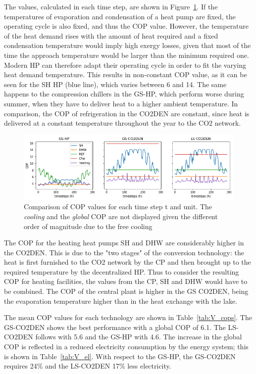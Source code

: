 \documentclass{article}
\begin{document}
The values, calculated in each time step, are shown in Figure~\ref{fig:v_cop}. If the temperatures of evaporation and condensation of a heat pump are fixed, the operating cycle is also fixed, and thus the COP value. However, the temperature of the heat demand rises with the amount of heat required and a fixed condensation temperature would imply high exergy losses, given that most of the time the approach temperature would be larger than the minimum required one. Modern HP can therefore adapt their operating cycle in order to fit the varying heat demand temperature. This results in non-constant COP value, as it can be seen for the SH HP (blue line), which varies between 6 and 14. The same happens to the compression chillers in the GS-HP, which perform worse during summer, when they have to deliver heat to a higher ambient temperature. In comparison, the COP of refrigeration in the CO2DEN are constant, since heat is delivered at a constant temperature throughout the year to the CO2 network.

\begin{figure}[tph]
	\centering
	\includegraphics[width=1\linewidth]{Images/V_COP}
	\caption{Comparison of COP values for each time step t and unit. The \textit{cooling } and the \textit{global} COP are not displayed given the different order of magnitude due to the free cooling}
	\label{fig:v_cop}
\end{figure}

The COP for the heating heat pumps SH and DHW are considerably higher in the CO2DEN. This is due to the "two stages" of the conversion technology: the heat is first furnished to the CO2 network by the CP and then brought up to the required temperature by the decentralized HP. Thus to consider the resulting COP for heating facilities, the values from the CP, SH and DHW would have to be combined. The COP of the central plant is higher in the GS CO2DEN, being the evaporation temperature higher than in the heat exchange with the lake. 



The mean COP values for each technology are shown in Table~\ref{tab:V_cops}. The GS-CO2DEN shows the best performance with a global COP of 6.1. The LS-CO2DEN follows with 5.6 and the GS-HP with 4.6. The increase in the global COP is reflected in a reduced electricity consumption by the energy system; this is shown in Table~\ref{tab:V_el}. With respect to the GS-HP, the GS-CO2DEN requires 24\% and the LS-CO2DEN 17\% less electricity.\\
\end{document}
